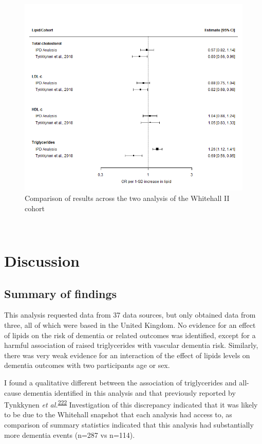 \documentclass[a4paper, twoside]{templates/ociamthesis}
\begin{document}
\begin{figure}[H]
\includegraphics[width=1\linewidth]{figures/ipd/whitehall_comparison} \caption[Comparison of results across the two analysis of the Whitehall II cohort]{Comparison of results across the two analysis of the Whitehall II cohort}\label{fig:whitehallComparison}
\end{figure}

~

\hypertarget{discussion-3}{%
\section{Discussion}\label{discussion-3}}

\hypertarget{summary-of-findings-2}{%
\subsection{Summary of findings}\label{summary-of-findings-2}}

This analysis requested data from 37 data sources, but only obtained data from three, all of which were based in the United Kingdom. No evidence for an effect of lipids on the risk of dementia or related outcomes was identified, except for a harmful association of raised triglycerides with vascular dementia risk. Similarly, there was very weak evidence for an interaction of the effect of lipids levels on dementia outcomes with two participants age or sex.

I found a qualitative different between the association of triglycerides and all-cause dementia identified in this analysis and that previously reported by Tynkkynen \emph{et al.}\textsuperscript{\protect\hyperlink{ref-tynkkynen2018}{222}}
Investigation of this discrepancy indicated that it was likely to be due to the Whitehall snapshot that each analysis had access to, as comparison of summary statistics indicated that this analysis had substantially more dementia events (n=287 vs n=114).
\end{document}
